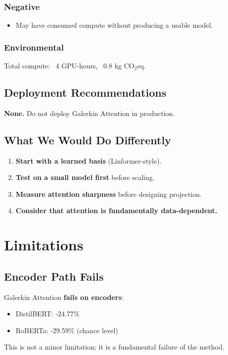 \subsubsection{Negative}

\begin{itemize}
\item May have consumed compute without producing a usable model.

\end{itemize}
\subsubsection{Environmental}

Total compute: ~4 GPU-hours, ~0.8 kg CO$_2$eq.

\subsection{Deployment Recommendations}

\textbf{None.} Do not deploy Galerkin Attention in production.

\subsection{What We Would Do Differently}

\begin{enumerate}
\item \textbf{Start with a learned basis} (Linformer-style).
\item \textbf{Test on a small model first} before scaling.
\item \textbf{Measure attention sharpness} before designing projection.
\item \textbf{Consider that attention is fundamentally data-dependent.}

\end{enumerate}



\section{Limitations}

\subsection{Encoder Path Fails}

Galerkin Attention \textbf{fails on encoders}:
\begin{itemize}
\item DistilBERT: -24.77\%
\item RoBERTa: -29.59\% (chance level)

\end{itemize}
This is not a minor limitation; it is a fundamental failure of the method.

